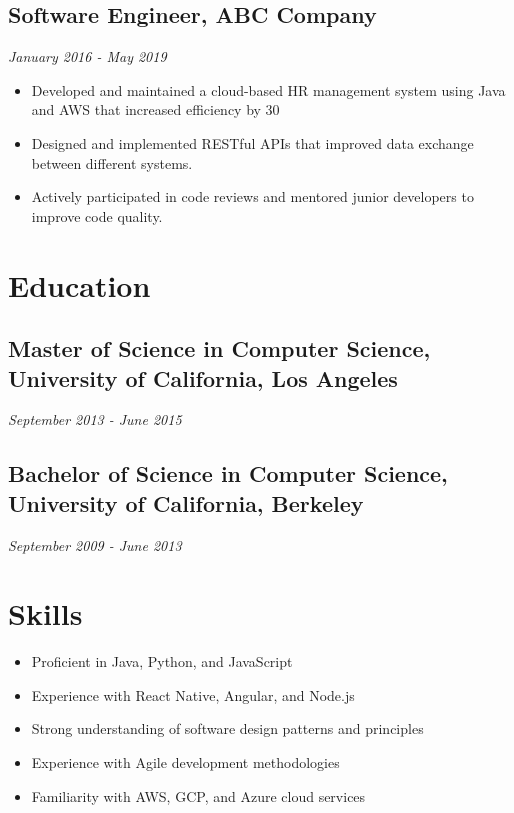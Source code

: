 \documentclass[11pt,a4paper]{article}
\begin{document}
\subsection{Software Engineer, ABC Company}

\textit{January 2016 - May 2019}

\begin{itemize}
\item Developed and maintained a cloud-based HR management system using Java and AWS that increased efficiency by 30%
\item Designed and implemented RESTful APIs that improved data exchange between different systems.
\item Actively participated in code reviews and mentored junior developers to improve code quality.
\end{itemize}

\section{Education}

\subsection{Master of Science in Computer Science, University of California, Los Angeles}

\textit{September 2013 - June 2015}

\subsection{Bachelor of Science in Computer Science, University of California, Berkeley}

\textit{September 2009 - June 2013}

\section{Skills}

\begin{itemize}
\item Proficient in Java, Python, and JavaScript
\item Experience with React Native, Angular, and Node.js
\item Strong understanding of software design patterns and principles
\item Experience with Agile development methodologies
\item Familiarity with AWS, GCP, and Azure cloud services
\end{itemize}
\end{document}

